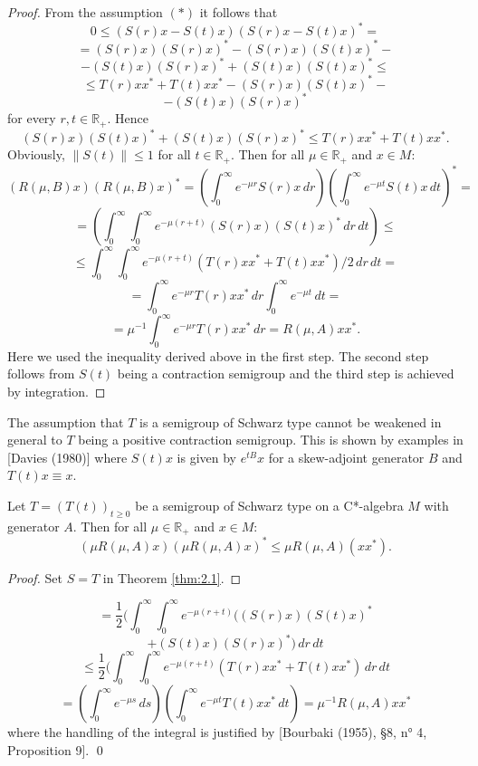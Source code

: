 \begin{proof}
From the assumption $ (*) $ it follows that
\[
0 \leq (S(r)x - S(t)x)(S(r)x - S(t)x)^* =
\]
\[
= (S(r)x)(S(r)x)^* - (S(r)x)(S(t)x)^* -
\]
\[
- (S(t)x)(S(r)x)^* + (S(t)x)(S(t)x)^* \leq
\]
\[
\leq T(r)xx^* + T(t)xx^* - (S(r)x)(S(t)x)^* -
\]
\[
- (S(t)x)(S(r)x)^*
\]
for every $ r,t \in \mathbb{R}_+ $.
Hence
\[
(S(r)x)(S(t)x)^* + (S(t)x)(S(r)x)^* \leq T(r)xx^* + T(t)xx^*.
\]
Obviously, $ \|S(t)\| \leq 1 $ for all $ t \in \mathbb{R}_+ $.
Then for all $ \mu \in \mathbb{R}_+ $ and $ x \in M $:
\[
(R(\mu,B)x)(R(\mu,B)x)^* = (\int_0^\infty e^{-\mu r}S(r)x \, dr)(\int_0^\infty e^{-\mu t}S(t)x \, dt)^* =
\]
\[
= (\int_0^\infty \int_0^\infty e^{-\mu(r+t)} (S(r)x)(S(t)x)^* \, dr \, dt) \leq
\]
\[
\leq \int_0^\infty \int_0^\infty e^{-\mu(r+t)} (T(r)xx^* + T(t)xx^*)/2 \, dr \, dt =
\]
\[
= \int_0^\infty e^{-\mu r} T(r)xx^* \, dr \int_0^\infty e^{-\mu t} \, dt =
\]
\[
= \mu^{-1} \int_0^\infty e^{-\mu r} T(r)xx^* \, dr = R(\mu,A)xx^*.
\]
Here we used the inequality derived above in the first step.
The second step follows from $ S(t)$ being a contraction semigroup and the third step is achieved by integration.
\end{proof}

\begin{remark}
The assumption that $ T $ is a semigroup of Schwarz type cannot be weakened in general to $ T $ being a positive contraction semigroup.
This is shown by examples in [Davies (1980)] where $ S(t)x $ is given by $ e^{tB}x $ for a skew-adjoint generator $ B $ and $ T(t)x \equiv x $.
\end{remark}

\begin{corollary}\label{cor:2.2}
Let $ T = (T(t))_{t\geq0} $ be a semigroup of Schwarz type on a C*-algebra $ M $ with generator $ A $.
Then for all $ \mu \in \mathbb{R}_+ $ and $ x \in M $:
\[
(\mu R(\mu,A)x)(\mu R(\mu,A)x)^* \leq \mu R(\mu,A)(xx^*).
\]
\end{corollary}

\begin{proof}
Set $ S = T $ in Theorem \ref{thm:2.1}.
\end{proof}


\[
= \frac{1}{2}(\int_0^\infty \int_0^\infty e^{-\mu(r+t)} ((S(r)x)(S(t)x)^*
\]
\[
+ (S(t)x)(S(r)x)^*) \, dr \, dt
\]
\[
\leq \frac{1}{2}(\int_0^\infty \int_0^\infty e^{-\mu(r+t)} (T(r)xx^* + T(t)xx^*) \, dr \, dt
\]
\[
= (\int_0^\infty e^{-\mu s} \, ds)(\int_0^\infty e^{-\mu t}T(t)xx^* \, dt) = \mu^{-1}R(\mu,A)xx^*
\]
where the handling of the integral is justified by [Bourbaki (1955), §8, n° 4, Proposition 9].
\qed

